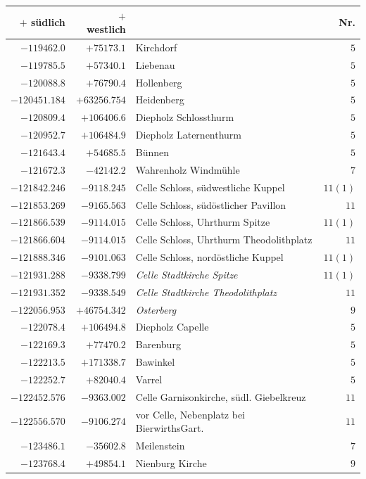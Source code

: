 \begin{center}\begingroup\fontsize{8}{9}\selectfont
\setlength{\tabcolsep}{4pt}
\begin{tabular}{r|r|p{170pt}|r}\hline
\(+\) südlich&\(+\) westlich&&Nr.\\\hline
\(-119462.0\)&\(+75173.1\)&Kirchdorf&\(5\)\\
\(-119785.5\)&\(+57340.1\)&Liebenau&\(5\)\\
\(-120088.8\)&\(+76790.4\)&Hollenberg&\(5\)\\
\(-120451.184\)&\(+63256.754\)&Heidenberg&\(5\)\\
\(-120809.4\)&\(+106406.6\)&Diepholz Schlossthurm&\(5\)\\
\(-120952.7\)&\(+106484.9\)&Diepholz Laternenthurm&\(5\)\\
\(-121643.4\)&\(+54685.5\)&Bünnen&\(5\)\\
\(-121672.3\)&\(-42142.2\)&Wahrenholz Windmühle&\(7\)\\
\(-121842.246\)&\(-9118.245\)&Celle Schloss, südwestliche Kuppel&\(11 (1)\)\\
\(-121853.269\)&\(-9165.563\)&Celle Schloss, südöstlicher Pavillon&\(11\)\\
\(-121866.539\)&\(-9114.015\)&Celle Schloss, Uhrthurm Spitze&\(11 (1)\)\\
\(-121866.604\)&\(-9114.015\)&Celle Schloss, Uhrthurm Theodolithplatz&\(11\)\\
\(-121888.346\)&\(-9101.063\)&Celle Schloss, nordöstliche Kuppel&\(11 (1)\)\\
\(-121931.288\)&\(-9338.799\)&\textit{Celle Stadtkirche Spitze}&\(11 (1)\)\\
\(-121931.352\)&\(-9338.549\)&\textit{Celle Stadtkirche Theodolithplatz}&\(11\)\\
\(-122056.953\)&\(+46754.342\)&\textit{Osterberg}&\(9\)\\
\(-122078.4\)&\(+106494.8\)&Diepholz Capelle&\(5\)\\
\(-122169.3\)&\(+77470.2\)&Barenburg&\(5\)\\
\(-122213.5\)&\(+171338.7\)&Bawinkel&\(5\)\\
\(-122252.7\)&\(+82040.4\)&Varrel&\(5\)\\
\(-122452.576\)&\(-9363.002\)&Celle Garnisonkirche, südl. Giebelkreuz&\(11\)\\
\(-122556.570\)&\(-9106.274\)&vor Celle, Nebenplatz bei BierwirthsGart.&\(11\)\\
\(-123486.1\)&\(-35602.8\)&Meilenstein&\(7\)\\
\(-123768.4\)&\(+49854.1\)&Nienburg Kirche&\(9\)\\

\end{tabular}
\end{center}
